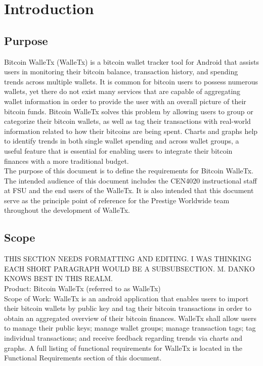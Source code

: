 \section{Introduction}

	\subsection{Purpose}
	
	Bitcoin WalleTx (WalleTx) is a bitcoin wallet tracker tool for Android that assists users in monitoring their bitcoin balance, transaction history, and spending trends across multiple wallets. It is common for bitcoin users to possess numerous wallets, yet there do not exist many services that are capable of aggregating wallet information in order to provide the user with an overall picture of their bitcoin funds. Bitcoin WalleTx solves this problem by allowing users to group or categorize their bitcoin wallets, as well as tag their transactions with real-world information related to how their bitcoins are being spent. Charts and graphs help to identify trends in both single wallet spending and across wallet groups, a useful feature that is essential for enabling users to integrate their bitcoin finances with a more traditional budget.\\

	The purpose of this document is to define the requirements for Bitcoin WalleTx. The intended audience of this document includes the CEN4020 instructional staff at FSU and the end users of the WalleTx. It is also intended that this document serve as the principle point of reference for the Prestige Worldwide team throughout the development of WalleTx.\\

	\subsection{Scope}
	
	THIS SECTION NEEDS FORMATTING AND EDITING. I WAS THINKING EACH SHORT PARAGRAPH WOULD BE A SUBSUBSECTION. M. DANKO KNOWS BEST IN THIS REALM.\\
	
	Product: Bitcoin WalleTx (referred to as WalleTx)\\

	Scope of Work: WalleTx is an android application that enables users to import their bitcoin wallets by public key and tag their bitcoin transactions in order to obtain an aggregated overview of their bitcoin finances. WalleTx shall allow users to manage their public keys; manage wallet groups; manage transaction tags; tag individual transactions; and receive feedback regarding trends via charts and graphs. A full listing of functional requirements for WalleTx is located in the Functional Requirements section of this document.\\
	
